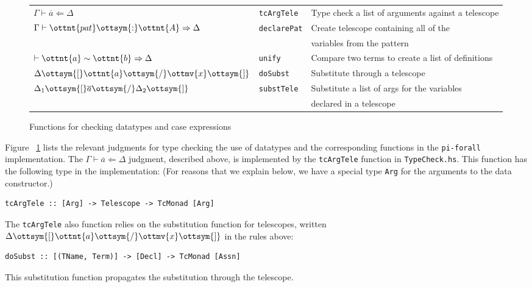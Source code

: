 \documentclass{article}
\newcommand\cd[1]{\lstinline[language=Haskell]{#1}}
\newcommand\pif{\texttt{pi-forall}\xspace}
\theoremstyle{definition}
\begin{document}
\begin{figure}[ht]
\begin{tabular}{lll}
$\Gamma  \vdash  \overline{a}  \Leftarrow  \Delta$   & \texttt{tcArgTele}
   & Type check a list of arguments against a telescope \\
$\Gamma  \vdash  \ottnt{pat}  \ottsym{:}  \ottnt{A}  \Rightarrow  \Delta$ & \texttt{declarePat}
   & Create telescope containing all of the \\
   && variables from the pattern \\
$\vdash  \ottnt{a}  \sim  \ottnt{b}  \Rightarrow  \Delta$  & \texttt{unify}
   & Compare two terms to create a list of definitions \\
$\Delta  \ottsym{[}  \ottnt{a}  \ottsym{/}  \ottmv{x}  \ottsym{]} $  & \texttt{doSubst}
   & Substitute through a telescope \\
$\Delta_{{\mathrm{1}}}  \ottsym{[}  \overline{a}  \ottsym{/}  \Delta_{{\mathrm{2}}}  \ottsym{]}$ & \texttt{substTele}
   & Substitute a list of args for the variables \\
   && declared in a telescope \\
\end{tabular}
\caption{Functions for checking datatypes and case expressions}
\label{fig:data}
\end{figure}

Figure ~\ref{fig:data} lists the relevant judgments for type checking the use
of datatypes and the corresponding functions in the \pif implementation.  The
$\Gamma  \vdash  \overline{a}  \Leftarrow  \Delta$ judgment, described above, is implemented by the
\cd{tcArgTele} function in \texttt{TypeCheck.hs}. This function has the
following type in the implementation: (For reasons that we explain below, we
have a special type \texttt{Arg} for the arguments to the data constructor.)

\begin{verbatim}
tcArgTele :: [Arg] -> Telescope -> TcMonad [Arg]
\end{verbatim}

The \cd{tcArgTele} also function relies on the substitution function for
telescopes, written $\Delta  \ottsym{[}  \ottnt{a}  \ottsym{/}  \ottmv{x}  \ottsym{]}$ in the rules above:

\begin{verbatim}
doSubst :: [(TName, Term)] -> [Decl] -> TcMonad [Assn]
\end{verbatim}

This substitution function propagates the substitution through
the telescope.
\end{document}
